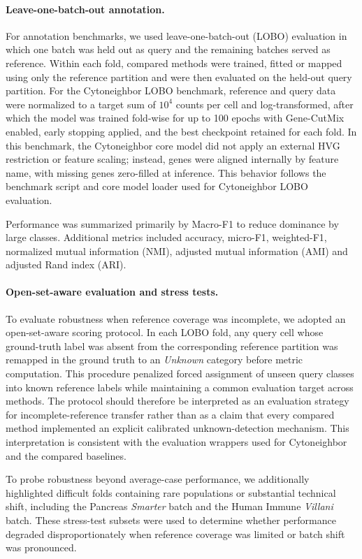 \documentclass[11pt]{article}
\begin{document}
\paragraph{Leave-one-batch-out annotation.}
For annotation benchmarks, we used leave-one-batch-out (LOBO) evaluation in which one batch was held out as query and the remaining batches served as reference. Within each fold, compared methods were trained, fitted or mapped using only the reference partition and were then evaluated on the held-out query partition. For the Cytoneighbor LOBO benchmark, reference and query data were normalized to a target sum of $10^{4}$ counts per cell and log-transformed, after which the model was trained fold-wise for up to 100 epochs with Gene-CutMix enabled, early stopping applied, and the best checkpoint retained for each fold. In this benchmark, the Cytoneighbor core model did not apply an external HVG restriction or feature scaling; instead, genes were aligned internally by feature name, with missing genes zero-filled at inference. This behavior follows the benchmark script and core model loader used for Cytoneighbor LOBO evaluation. 

Performance was summarized primarily by Macro-F1 to reduce dominance by large classes. Additional metrics included accuracy, micro-F1, weighted-F1, normalized mutual information (NMI), adjusted mutual information (AMI) and adjusted Rand index (ARI).

\paragraph{Open-set-aware evaluation and stress tests.}
To evaluate robustness when reference coverage was incomplete, we adopted an open-set-aware scoring protocol. In each LOBO fold, any query cell whose ground-truth label was absent from the corresponding reference partition was remapped in the ground truth to an \textit{Unknown} category before metric computation. This procedure penalized forced assignment of unseen query classes into known reference labels while maintaining a common evaluation target across methods. The protocol should therefore be interpreted as an evaluation strategy for incomplete-reference transfer rather than as a claim that every compared method implemented an explicit calibrated unknown-detection mechanism. This interpretation is consistent with the evaluation wrappers used for Cytoneighbor and the compared baselines. 

To probe robustness beyond average-case performance, we additionally highlighted difficult folds containing rare populations or substantial technical shift, including the Pancreas \textit{Smarter} batch and the Human Immune \textit{Villani} batch. These stress-test subsets were used to determine whether performance degraded disproportionately when reference coverage was limited or batch shift was pronounced.
\end{document}
